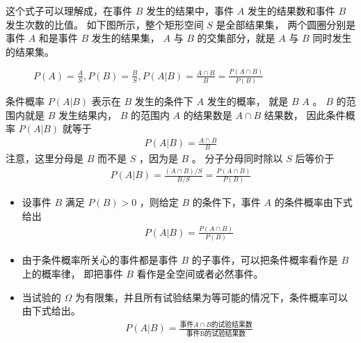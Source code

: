 \documentclass[letterpaper,10pt,english]{sphinxmanual}
\begin{document}
这个式子可以理解成，在事件 \(B\) 发生的结果中，事件 \(A\) 发生的结果数和事件 \(B\) 发生次数的比值。
如下图所示，整个矩形空间 \(S\) 是全部结果集，
两个圆圈分别是事件 \(A\) 和是事件 \(B\) 发生的结果集，
\(A\) 与 \(B\) 的交集部分，就是 \(A\) 与 \(B\) 同时发生的结果集。

\begin{figure}[htbp]
\centering
\capstart

\noindent{}
\caption{\(P(A) = \frac{A}{S},P(B) = \frac{B}{S},P(A|B) = \frac{A \cap B}{B}= \frac{P(A \cap B)}{P(B)}\)}\label{\detokenize{_u6982_u7387_u57fa_u7840/content:id24}}\label{\detokenize{_u6982_u7387_u57fa_u7840/content:fg-probability-03}}\end{figure}

条件概率 \(P(A|B)\) 表示在 \(B\) 发生的条件下 \(A\) 发生的概率，
就是  \(B\)  \(A\) 。
\(B\) 的范围内就是  \(B\) 发生结果内，
\(B\) 的范围内 \(A\) 的结果数是 \(A \cap B\) 结果数，
因此条件概率 \(P(A|B)\) 就等于
\begin{equation}\label{equation:概率基础/content:概率基础/content:8}
\begin{split}P(A|B) = \frac{A \cap B}{B}\end{split}
\end{equation}
注意，这里分母是 \(B\) 而不是 \(S\) ，因为是 \(B\) 。
分子分母同时除以 \(S\) 后等价于
\begin{equation}\label{equation:概率基础/content:概率基础/content:9}
\begin{split}P(A|B) = \frac{(A \cap B)/S}{B/S} = \frac{P(A \cap B)}{P(B)}\end{split}
\end{equation}
\begin{sphinxShadowBox}
\begin{itemize}
\item {} 
设事件 \(B\) 满足 \(P(B) > 0\) ，则给定 \(B\) 的条件下，事件 \(A\) 的条件概率由下式给出
\begin{equation}\label{equation:概率基础/content:概率基础/content:10}
\begin{split}P(A|B) = \frac{P(A \cap B)}{P(B)}\end{split}
\end{equation}
\item {} 
由于条件概率所关心的事件都是事件 \(B\) 的子事件，可以把条件概率看作是 \(B\) 上的概率律，
即把事件 \(B\) 看作是全空间或者必然事件。

\item {} 
当试验的 \(\Omega\) 为有限集，并且所有试验结果为等可能的情况下，条件概率可以由下式给出。
\begin{equation}\label{equation:概率基础/content:概率基础/content:11}
\begin{split}P(A|B) = \frac{ \text{事件} A \cap B \text{的试验结果数} }{\text{事件B的试验结果数}}\end{split}
\end{equation}
\end{itemize}
\end{sphinxShadowBox}
\end{document}
